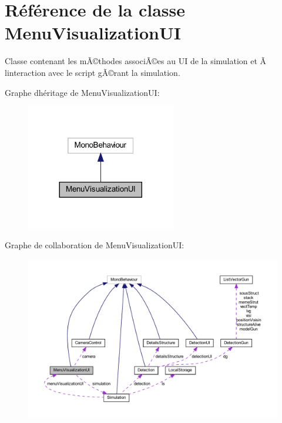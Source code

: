\hypertarget{class_menu_visualization_u_i}{}\section{Référence de la classe Menu\+Visualization\+UI}
\label{class_menu_visualization_u_i}


Classe contenant les mÃ©thodes associÃ©es au UI de la simulation et Ã  l\textquotesingle{}interaction avec le script gÃ©rant la simulation.  




Graphe d\textquotesingle{}héritage de Menu\+Visualization\+UI\+:\nopagebreak
\begin{figure}[H]
\begin{center}
\leavevmode
\includegraphics[width=185pt]{class_menu_visualization_u_i__inherit__graph}
\end{center}
\end{figure}


Graphe de collaboration de Menu\+Visualization\+UI\+:
\nopagebreak
\begin{figure}[H]
\begin{center}
\leavevmode
\includegraphics[width=350pt]{class_menu_visualization_u_i__coll__graph}
\end{center}
\end{figure}
